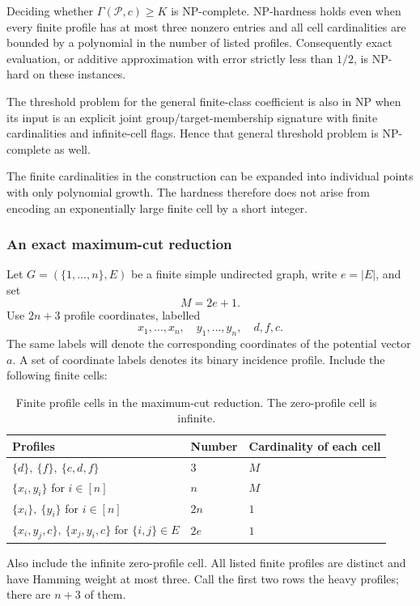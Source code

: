 \begin{theorem}\label{gm:thm:complexity}
Deciding whether $\Gamma(\mathcal P,c)\ge K$ is NP-complete. NP-hardness holds even when every finite profile has at most three nonzero entries and all cell cardinalities are bounded by a polynomial in the number of listed profiles. Consequently exact evaluation, or additive approximation with error strictly less than $1/2$, is NP-hard on these instances.

The threshold problem for the general finite-class coefficient is also in NP when its input is an explicit joint group/target-membership signature with finite cardinalities and infinite-cell flags. Hence that general threshold problem is NP-complete as well.
\end{theorem}
The finite cardinalities in the construction can be expanded into individual points with only polynomial growth. The hardness therefore does not arise from encoding an exponentially large finite cell by a short integer.

\subsubsection{An exact maximum-cut reduction}
Let $G=(\{1,\ldots,n\},E)$ be a finite simple undirected graph, write $e=|E|$, and set
\[
M=2e+1.
\]
Use $2n+3$ profile coordinates, labelled
\[
x_1,\ldots,x_n,\quad y_1,\ldots,y_n,\quad d,f,c.
\]
The same labels will denote the corresponding coordinates of the potential vector $a$. A set of coordinate labels denotes its binary incidence profile. Include the following finite cells:

\begin{table}[tbp]
\centering
\caption{Finite profile cells in the maximum-cut reduction. The zero-profile cell is infinite.}
\label{gm:tab:hardness}
\begin{tabular}{@{}lll@{}}
\toprule
Profiles & Number & Cardinality of each cell\\
\midrule
$\{d\},\ \{f\},\ \{c,d,f\}$ & $3$ & $M$\\
$\{x_i,y_i\}$ for $i\in[n]$ & $n$ & $M$\\
$\{x_i\},\ \{y_i\}$ for $i\in[n]$ & $2n$ & $1$\\
$\{x_i,y_j,c\},\ \{x_j,y_i,c\}$ for $\{i,j\}\in E$ & $2e$ & $1$\\
\bottomrule
\end{tabular}
\end{table}
Also include the infinite zero-profile cell. All listed finite profiles are distinct and have Hamming weight at most three. Call the first two rows the heavy profiles; there are $n+3$ of them.

